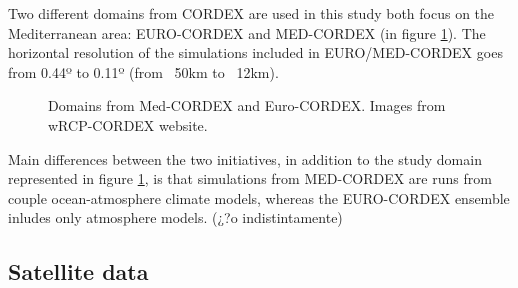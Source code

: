 Two different domains from CORDEX are used in this study both focus on the Mediterranean area: EURO-CORDEX and MED-CORDEX (in figure \ref{fig:cordexdomain}). The horizontal resolution of the simulations included in EURO/MED-CORDEX goes from 0.44º to 0.11º (from ~50km to ~12km).

\begin{figure}[!tbp]
  \centering
  \hfill
  \caption{Domains from Med-CORDEX and Euro-CORDEX. Images from wRCP-CORDEX website.}
    \label{fig:cordexdomain}
\end{figure}

Main differences between the two initiatives, in addition to the study domain represented in figure \ref{fig:cordexdomain}, is that simulations from MED-CORDEX are runs from couple ocean-atmosphere climate models, whereas the EURO-CORDEX ensemble inludes only atmosphere models. (¿?o indistintamente)


\subsection{Satellite data}
 
